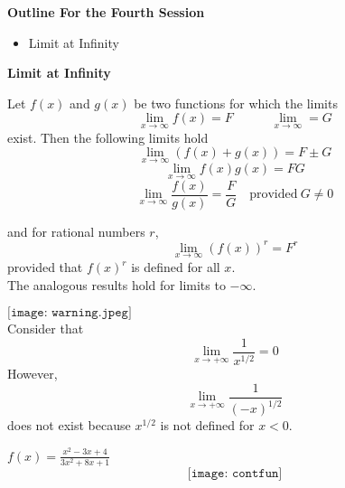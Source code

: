 \documentclass{beamer}
\begin{document}
\begin{frame}{\bf Outline For the Fourth Session}
\begin{itemize}
	\item Limit at Infinity
\end{itemize}
\end{frame}

\begin{frame}
\begin{center}
	{\bf \color{blue} Limit at Infinity}
\end{center}

\end{frame}

\begin{frame}
\begin{tcolorbox}[width=\textwidth,colback={blue!10},title={},colbacktitle=yellow,coltitle=blue] 
	\begin{theorem}
		Let $f(x)$ and $g(x)$ be two functions for which the limits 
		$$ \lim_{x\to \infty}f(x)=F\quad \quad \quad \lim_{x\to \infty}=G$$
		exist. Then the following limits hold
		$$
		\lim_{x\to \infty} (f(x)+g(x))=F\pm G
		$$
		$$
		\lim_{x\to \infty}f(x)g(x)=FG
		$$
		$$
		\lim_{x\to \infty}\frac{f(x)}{g(x)}=\frac{F}{G} \quad \text{provided}~G\neq 0
		$$
	\end{theorem}
\end{tcolorbox}
\end{frame}




\begin{frame}
\begin{tcolorbox}[width=\textwidth,colback={blue!10},title={},colbacktitle=yellow,coltitle=blue] 
		and for rational numbers $r$,
		$$\lim_{x\to \infty}(f(x))^r=F^r$$ provided that $f(x)^r$ is defined for all $x$.\\
		The analogous results hold for limits to $-\infty$.
\end{tcolorbox}
\end{frame}

\begin{frame}
	$
\texttt{[image: warning.jpeg]}
$\\
\noindent {\bf \color{red}{Warning:}} Consider that 
$$\lim_{x\to +\infty}\frac{1}{x^{1/2}}=0$$ However, 
$$\lim_{x\to +\infty}\frac{1}{(-x)^{1/2}}$$  does not exist because $x^{1/2}$ is not defined for $x<0$.
\end{frame}

\begin{frame}{$f(x)=\frac{x^2-3x+4}{3x^2+8x+1}$}
$$
\texttt{[image: contfun]}
$$
\end{frame}
\end{document}
